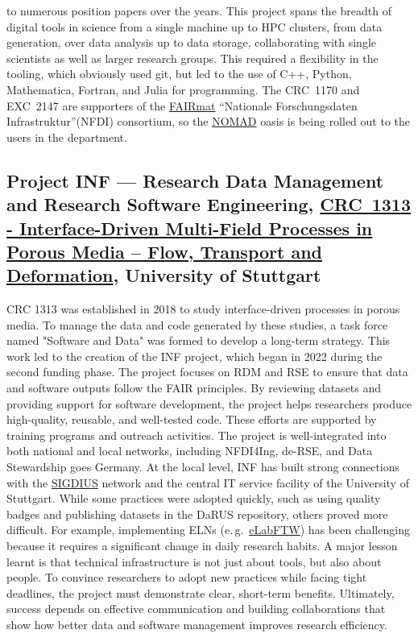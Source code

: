 \documentclass{eceasst}
\newcommand{\eg}{e.\,g.}
\newcommand{\elabftw}{\href{https://www.elabftw.net/}{eLabFTW}}
\begin{document}
to numerous position papers\cite{Anzt:2020,Goth:2025,gi2025,Kempf2026} over the years.
This project spans the breadth of digital tools in science from a single machine up to HPC clusters, from data generation, over data analysis up to data storage, collaborating with single scientists as well as larger research groups.
This required a flexibility in the tooling, which obviously used git, but led to the use of C++, Python, Mathematica, Fortran, and Julia for programming.
The CRC~1170 and EXC~2147 are supporters of the \href{https://www.fairmat-nfdi.eu/fairmat/}{FAIRmat} ``Nationale Forschungsdaten Infrastruktur''(NFDI) consortium, so the \href{https://nomad-lab.eu/nomad-lab/nomad.html}{NOMAD} oasis is being rolled out to
the users in the department.

\subsection{Project INF --- Research Data Management and Research Software Engineering, \href{https://gepris.dfg.de/gepris/projekt/327154368}{CRC~1313 - Interface-Driven Multi-Field Processes in Porous Media – Flow, Transport and Deformation}, University of Stuttgart}
CRC 1313 was established in 2018 to study interface-driven processes in porous media.
To manage the data and code generated by these studies, a task force named "Software and Data" was formed to develop a long-term strategy.
This work led to the creation of the INF project, which began in 2022 during the second funding phase.
The project focuses on RDM and RSE to ensure that data and software outputs follow the FAIR principles.
By reviewing datasets and providing support for software development, the project helps researchers produce high-quality, reusable, and well-tested code.
These efforts are supported by training programs and outreach activities.
The project is well-integrated into both national and local networks, including NFDI4Ing, de-RSE, and Data Stewardship goes Germany.
At the local level, INF has built strong connections with the \href{https://www.simtech.uni-stuttgart.de/communication/events/workshops/sigdius-seminars/}{SIGDIUS} network and the central IT service facility of the University of Stuttgart. While some practices were adopted quickly, such as using quality badges and publishing datasets in the DaRUS repository, others proved more difficult.
For example, implementing ELNs (\eg~\elabftw) has been challenging because it requires a significant change in daily research habits.
A major lesson learnt is that technical infrastructure is not just about tools, but also about people. To convince researchers to adopt new practices while facing tight deadlines, the project must demonstrate clear, short-term benefits.
Ultimately, success depends on effective communication and building collaborations that show how better data and software management improves research efficiency.
\end{document}
